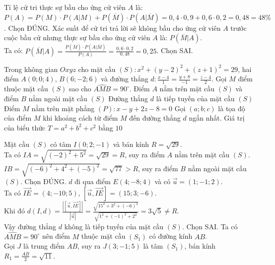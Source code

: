 \begin{ex}
{\begin{itemchoice}
			Tỉ lệ cử tri thực sự bầu cho ứng cử viên $A$ là:\\
			$P(A) = P(M) \cdot P(A|M) + P(\overline{M}) \cdot P(A|\overline{M}) = 0{,}4 \cdot 0{,}9 + 0{,}6 \cdot 0{,}2 = 0{,}48 = 48\%$. Chọn ĐÚNG.
			\itemch Xác suất để cử tri trả lời sẽ không bầu cho ứng cử viên $A$ trước cuộc bầu cử nhưng thực sự bầu cho ứng cử viên $A$ là: $P(\overline{M}|A)$.\\
			Ta có: $\displaystyle P(\overline{M}|A) = \frac{P(\overline{M}) \cdot P(A|\overline{M})}{P(A)} = \frac{0{,}6 \cdot 0{,}2}{0{,}48} = 0{,}25$. Chọn SAI.
		\end{itemchoice}
	}
\end{ex}

\begin{ex} %
	Trong không gian $Oxyz$ cho mặt cầu $(S) \colon x^2 + (y-2)^2 + (z+1)^2 = 29$, hai điểm $A(0; 0; 4)$, $B(6; -2; 6)$ và đường thẳng $\displaystyle d \colon \frac{x-4}{1} = \frac{y+8}{-1} = \frac{z-4}{2}$. Gọi $M$ điểm thuộc mặt cầu $(S)$ sao cho $\widehat{AMB} = 90^\circ$.
	\choiceTF
	{\True Điểm $A$ nằm trên mặt cầu $(S)$ và điểm $B$ nằm ngoài mặt cầu $(S)$}
	{Đường thẳng $d$ là tiếp tuyến của mặt cầu $(S)$}
	{\True Điểm $M$ nằm trên mặt phẳng $(P) \colon x - y + 2z - 8 = 0$}
	{Gọi $(a; b; c)$ là tọa độ của điểm $M$ khi khoảng cách từ điểm $M$ đến đường thẳng $d$ ngắn nhất. Giá trị của biểu thức $T = a^2 + b^2 + c^2$ bằng $10$}
	\loigiai
	{
		\begin{itemchoice}
			\itemch Mặt cầu $(S)$ có tâm $I(0; 2; -1)$ và bán kính $R = \sqrt{29}$.\\
			Ta có $IA = \sqrt{(-2)^2 + 5^2} = \sqrt{29} = R$, suy ra điểm $A$ nằm trên mặt cầu $(S)$.\\
			$IB = \sqrt{(-6)^2 + 4^2 + (-5)^2} = \sqrt{77} > R$, suy ra điểm $B$ nằm ngoài mặt cầu $(S)$. Chọn ĐÚNG.
			\itemch $d$ đi qua điểm $E(4; -8; 4)$ và có $\vec{u} = (1; -1; 2)$.\\
			Ta có $\overrightarrow{IE} = (4; -10; 5)$, $[\vec{u}, \overrightarrow{IE}] = (15; 3; -6)$.\\
			Khi đó $\displaystyle d(I, d) = \frac{|[\vec{u}, \overrightarrow{IE}]|}{|\vec{u}|} = \frac{\sqrt{15^2 + 3^2 + (-6)^2}}{\sqrt{1^2 + (-1)^2 + 2^2}} = 3\sqrt{5} \neq R$.\\
			Vậy đường thẳng $d$ không là tiếp tuyến của mặt cầu $(S)$. Chọn SAI.
			\itemch Ta có $\widehat{AMB} = 90^\circ$ nên điểm $M$ thuộc mặt cầu $(S_1)$ có đường kính $AB$.\\
			Gọi $J$ là trung điểm $AB$, suy ra $J(3; -1; 5)$ là tâm $(S_1)$, bán kính $\displaystyle R_1 = \frac{AB}{2} = \sqrt{11}$.\\

\end{itemchoice}}
\end{ex}
